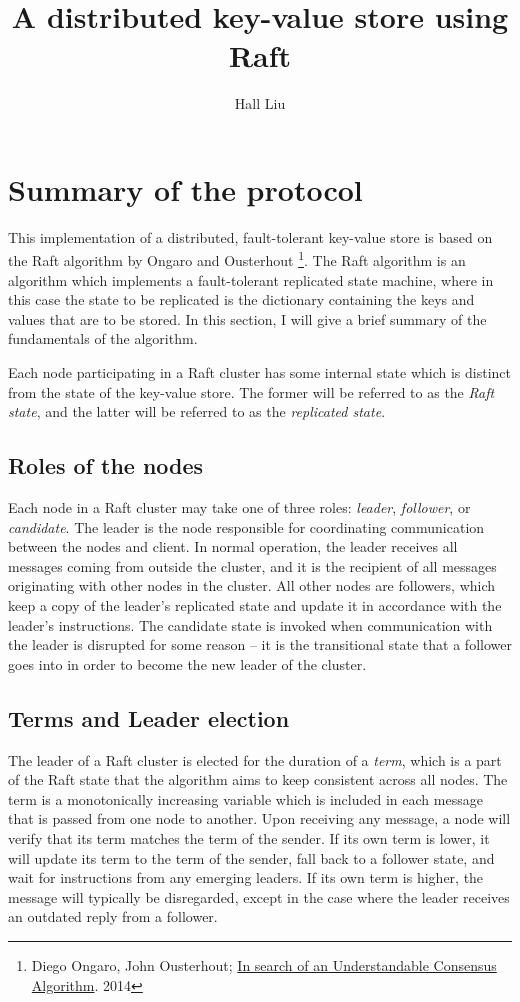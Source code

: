 \documentclass[psamsfonts]{amsart}
\title{A distributed key-value store using Raft}
\author{Hall Liu}
\begin{document}
\maketitle
\section{Summary of the protocol}
This implementation of a distributed, fault-tolerant key-value store is based on the Raft algorithm by Ongaro and Ousterhout \footnote{Diego Ongaro, John Ousterhout; \href{https://ramcloud.stanford.edu/wiki/download/attachments/11370504/raft.pdf}{In search of an Understandable Consensus Algorithm}. 2014}. The Raft algorithm is an algorithm which implements a fault-tolerant replicated state machine, where in this case the state to be replicated is the dictionary containing the keys and values that are to be stored. In this section, I will give a brief summary of the fundamentals of the algorithm.

Each node participating in a Raft cluster has some internal state which is distinct from the state of the key-value store. The former will be referred to as the \emph{Raft state}, and the latter will be referred to as the \emph{replicated state}. 
\subsection{Roles of the nodes}
Each node in a Raft cluster may take one of three roles: {\it leader}, {\it follower}, or {\it candidate}. The leader is the node responsible for coordinating communication between the nodes and client. In normal operation, the leader receives all messages coming from outside the cluster, and it is the recipient of all messages originating with other nodes in the cluster. All other nodes are followers, which keep a copy of the leader's replicated state and update it in accordance with the leader's instructions. The candidate state is invoked when communication with the leader is disrupted for some reason -- it is the transitional state that a follower goes into in order to become the new leader of the cluster.
\subsection{Terms and Leader election}
The leader of a Raft cluster is elected for the duration of a {\it term}, which is a part of the Raft state that the algorithm aims to keep consistent across all nodes. The term is a monotonically increasing variable which is included in each message that is passed from one node to another. Upon receiving any message, a node will verify that its term matches the term of the sender. If its own term is lower, it will update its term to the term of the sender, fall back to a follower state, and wait for instructions from any emerging leaders. If its own term is higher, the message will typically be disregarded, except in the case where the leader receives an outdated reply from a follower.
\end{document}

